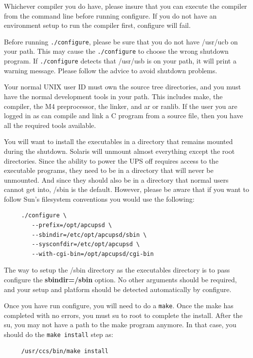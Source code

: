 Whichever compiler you do have, please insure that you can execute the
compiler from the command line before running configure. If you do not have an
environment setup to run the compiler first, configure will fail.  

Before running {\tt ./configure}, please be sure that you do not have /usr/ucb
on your path. This may cause the {\tt ./configure} to choose the wrong
shutdown program. If {\tt ./configure} detects that /usr/usb is on your path,
it will print a warning message. Please follow the advice to avoid shutdown
problems.  

Your normal UNIX user ID must own the source tree directories, and you must
have the normal development tools in your path. This includes make, the
compiler, the M4 preprocessor, the linker, and ar or ranlib. If the user you
are logged in as can compile and link a C program from a source file, then you
have all the required tools available.  

You will want to install the executables in a directory that remains mounted
during the shutdown. Solaris will unmount almost everything except the root
directories. Since the ability to power the UPS off requires access to the
executable programs, they need to be in a directory that will never be
unmounted. And since they should also be in a directory that normal users
cannot get into, /sbin is the default. However, please be aware that if you
want to follow Sun's filesystem conventions you would use the following: 

\footnotesize
\begin{verbatim}
     ./configure \
        --prefix=/opt/apcupsd \
        --sbindir=/etc/opt/apcupsd/sbin \
        --sysconfdir=/etc/opt/apcupsd \
        --with-cgi-bin=/opt/apcupsd/cgi-bin
\end{verbatim}
\normalsize

The way to setup the /sbin directory as the executables directory is to pass
configure the {\bf sbindir=/sbin} option. No other arguments should be
required, and your setup and platform should be detected automatically by
configure.  

Once you have run configure, you will need to do a {\tt make}.  Once the make
has completed with no errors, you must su to root to complete the install.
After the su, you may not have a path to the make program anymore. In that
case, you should do the {\tt make install} step as: 

\footnotesize
\begin{verbatim}
     /usr/ccs/bin/make install
\end{verbatim}
\normalsize


